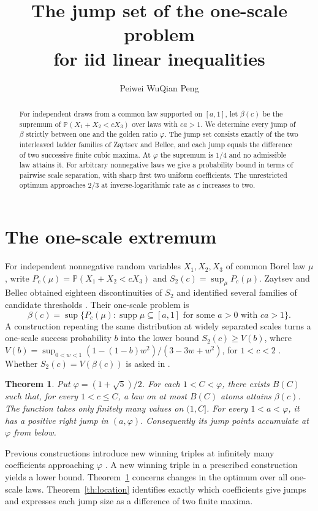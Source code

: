 \documentclass[11pt]{article}
\title{The jump set of the one-scale problem\\for iid linear inequalities}
\author{Peiwei Wu\qquad Qian Peng}
\date{}
\newtheorem{theorem}{Theorem}
\newcommand{\bbP}{\mathbb P}
\newcommand{\supp}{\operatorname{supp}}
\newcommand{\ph}{\varphi}
\begin{document}
\maketitle
\begin{abstract}
For independent draws from a common law supported on $[a,1]$, let
$\beta(c)$ be the supremum of $\bbP(X_1+X_2<cX_3)$ over laws with
$ca>1$. We determine every jump of $\beta$ strictly between one and
the golden ratio $\ph$. The jump set consists exactly of the two
interleaved ladder families of Zaytsev and Bellec, and each jump equals
the difference of two successive finite cubic maxima. At $\ph$ the
supremum is $1/4$ and no admissible law attains it. For arbitrary
nonnegative laws we give a probability bound in terms of pairwise
scale separation, with sharp first two uniform coefficients. The
unrestricted optimum approaches $2/3$ at inverse-logarithmic rate
as $c$ increases to two.
\end{abstract}

\section{The one-scale extremum}
For independent nonnegative random variables $X_1,X_2,X_3$ of common
Borel law $\mu$, write $P_c(\mu)=\bbP(X_1+X_2<cX_3)$ and
$S_2(c)=\sup_\mu P_c(\mu)$. Zaytsev and Bellec obtained eighteen
discontinuities of $S_2$ and identified several families of candidate
thresholds \cite[Theorem~1.3 and \S\S6.1.4--6.1.7]{zb}. Their
one-scale problem is
\[
 \beta(c)=\sup\{P_c(\mu):\supp\mu\subseteq[a,1]
                       \text{ for some }a>0\text{ with }ca>1\}.
\]
A construction repeating the same distribution at widely separated
scales turns a one-scale success probability $b$ into the lower bound
$S_2(c)\ge V(b)$, where
$V(b)=\sup_{0<w<1}(1-(1-b)w^2)/(3-3w+w^2)$, for $1<c<2$
\cite[Proposition~6.1]{zb}. Whether $S_2(c)=V(\beta(c))$ is asked in
\cite[\S7.3]{zb}.

\begin{theorem}\label{th:scale}
Put $\ph=(1+\sqrt5)/2$. For each $1<C<\ph$, there exists $B(C)$ such
that, for every $1<c\le C$, a law on at most $B(C)$ atoms attains
$\beta(c)$. The function takes only finitely many values on $(1,C]$.
For every $1<a<\ph$, it has a positive right jump in $(a,\ph)$.
Consequently its jump points accumulate at $\ph$ from below.
\end{theorem}

Previous constructions introduce new winning triples at infinitely
many coefficients approaching $\ph$ \cite[\S\S6.1.4--6.1.5]{zb}.
A new winning triple in a prescribed construction yields a lower bound.
Theorem~\ref{th:scale} concerns changes in the optimum over all
one-scale laws. Theorem~\ref{th:location} identifies exactly which coefficients give jumps and expresses each jump size as a difference of two finite maxima.
\end{document}
